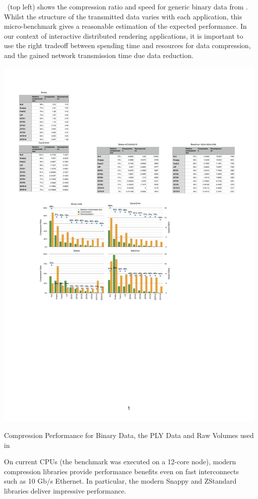 ~(top left) shows the compression ratio and speed for
generic binary data from \cite{ESP:18}. Whilst the structure of the transmitted
data varies with each application, this micro-bench\-mark gives a reasonable
estimation of the expected performance. In our context of interactive
distributed rendering applications, it is important to use the right tradeoff
between spending time and resources for data compression, and the gained
network transmission time due data reduction.

\begin{benchmark}[h!t]\center
  \includegraphics[width=\textwidth]{results/compressorDetail}
  \caption{\label{rCompressorDetail}Compression Performance for Binary Data, the PLY Data and Raw Volumes used in }
\end{benchmark}

On current CPUs (the benchmark was executed on a 12-core node), modern
compression libraries provide performance benefits even on fast interconnects
such as 10 Gb/s Ethernet. In particular, the modern Snappy and ZStandard
libraries deliver impressive performance.

